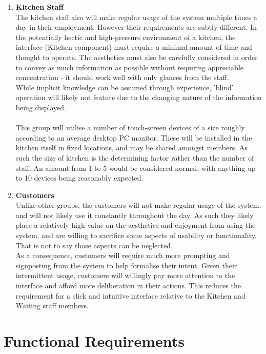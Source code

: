 \documentclass[11pt, a4paper]{report}
\begin{document}
\begin{enumerate}
\item \textbf{Kitchen Staff}\\
The kitchen staff also will make regular usage of the system multiple times a day in their employment. However their requirements are subtly different. In the potentially hectic and high-pressure environment of a kitchen, the interface (Kitchen component) must require a minimal amount of time and thought to operate. The aesthetics must also be carefully considered in order to convey as much information as possible without requiring appreciable concentration - it should work well with only glances from the staff.\\
While implicit knowledge can be assumed through experience, 'blind' operation will likely not feature due to the changing nature of the information being displayed.\\ 
\\
This group will utilise a number of touch-screen devices of a size roughly according to an average desktop PC monitor. These will be installed in the kitchen itself in fixed locations, and may be shared amongst members. As such the size of kitchen is the determining factor rather than the number of staff. An amount from 1 to 5 would be considered normal, with anything up to 10 devices being reasonably expected.


\item \textbf{Customers}\\
Unlike other groups, the customers will not make regular usage of the system, and will not likely use it constantly throughout the day. As such they likely place a relatively high value on the aesthetics and enjoyment from using the system, and are willing to sacrifice some aspects of usability or functionality. That is not to say those aspects can be neglected.\\
As a consequence, customers will require much more prompting and signposting from the system to help formalise their intent. Given their intermittent usage, customers will willingly pay more attention to the interface and afford more deliberation in their actions. This reduces the requirement for a slick and intuitive interface relative to the Kitchen and Waiting staff members.
\end{enumerate}







\section{Functional Requirements} \label{sec:Functional}
\end{document}
